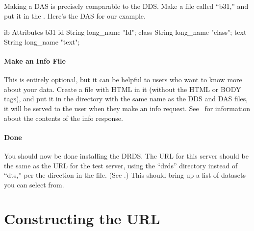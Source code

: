 \documentclass{dods-book}
\begin{document}
Making a DAS is precisely comparable to the DDS.  Make a file called
``b31,'' and put it in the .  Here's the DAS for
our example.

\begin{vcode}{ib}
Attributes {
  b31 {
    id {
      String long_name "Id";
    }
    class {
      String long_name "class";
    }
    text {
      String long_name "text";
    }
  }
}
\end{vcode}                  

\subsubsection{Make an Info File}

This is entirely optional, but it can be helpful to users who want to
know more about your data.  Create a file with HTML in it
(without the HTML or BODY tags), and put it in the
 directory with the same name as the DDS and DAS
files, it will be served to the user when they make an info request.
See \DODSquick\ for information about the contents of the info
response. 


\subsubsection{Done}
\label{server,drds,done}

You should now be done installing the DRDS.  The URL for this server
should be the same as the URL for the test server, using the ``drds''
directory instead of ``dts,'' per the  direction
in the  file.  (See .)
This should bring up a list of datasets you can select from.

 
\chapter{Constructing the URL}
\end{document}
